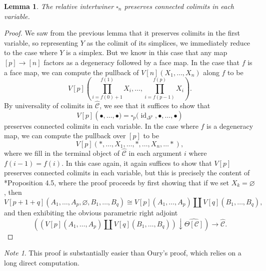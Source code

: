 \documentclass[leqno]{article}
\numberwithin{equation}{subsection}
\theoremstyle{plain}   %
\newtheorem{lemma}[equation]{Lemma}
\theoremstyle{remark}
\newtheorem{note}[equation]{Note}
\newtheorem{obs}[equation]{Observation}
\theoremstyle{plain}
\DeclareMathOperator{\id}{id}
\newcommand{\overcat}[2]{{\left(#1\downarrow #2\right)}}
\newcommand{\psh}[1]{\ensuremath{\widehat{#1}}}
\providecommand{\C}{}
\renewcommand{\C}{\ensuremath{\mathcal{C}}}
\begin{document}
\begin{comment}\begin{obs} 
	Given \(f:Y\to \Delta^n\), we can nail down the computation of \(\square_n(f, \Omega)\) using our previous computations because in this case, \(\Omega(\id_{\Delta^n})\) is determined by a choice of a family of \(\C\)-presheaves \((X_i)_{i=1}^n\).  Therefore, we have that for \([t]=[m](c_1,\dots,c_m)\),
	\[\square_n(f,X_1,\dots,X_n)_t = \coprod_{y:\Delta^m\to Y} \prod_{i=1}^m \prod_{k=fy(i-1)+1}^{fy(i)} X_{k,c_i}.\]
\end{obs}\end{comment}

\begin{lemma}\label{conncolims}
	The relative intertwiner \(\square_n\) preserves connected colimits in each variable.  
\end{lemma}
\begin{proof}
	We saw from the previous lemma that it preserves colimits in the first variable, so representing \(Y\) as the colimit of its simplices, we immediately reduce to the case where \(Y\) is a simplex.  But we know in this case that any map \([p]\to [n]\) factors as a degeneracy followed by a face map.  In the case that \(f\) is a face map, we can compute the pullback of \(V[n](X_1,\dots,X_n)\) along \(f\) to be 
	\[V[p]\left(\prod_{i=f(0)+1}^{f(1)}X_i,\dots, \prod_{i=f(p-1)}^{f(p)}X_i\right).\]  By universality of colimits in \(\psh{\C}\), we see that it suffices to show that \[V[p]\left(\bullet,\dots,\bullet)=\square_p(\id_{\Delta^p},\bullet,\dots,\bullet\right)\] preserves connected colimits in each variable.  In the case where \(f\) is a degeneracy map, we can compute the pullback over \([p]\) to be \[V[p](\ast, \dots, X_1, \dots, \ast, \dots, X_n, \dots \ast),\] where we fill in the terminal object of \(\psh{\C}\) in each argument \(i\) where \(f(i-1)=f(i)\).  In this case again, it again suffices to show that \(V[p]\) preserves connected colimits in each variable, but this is precisely the content of \cite{rezk-theta-n-spaces}*{Proposition 4.5}, where the proof proceeds by first showing that if we set \(X_k=\varnothing\), then
	\[V[p+1+q](A_1,\dots, A_p, \varnothing, B_1,\dots ,B_q) \cong V[p](A_1,\dots,A_p) \coprod V[q](B_1,\dots,B_q),\]
	and then exhibiting the obvious parametric right adjoint
	\[\overcat{\left(V[p](A_1,\dots,A_p) \coprod V[q](B_1,\dots,B_q)\right)}{\psh{\Theta[\C]}}\to \psh{\C}.\]
\end{proof}
\begin{note} 
	This proof is substantially easier than Oury's proof, which relies on a long direct computation.
\end{note}
\end{document}
